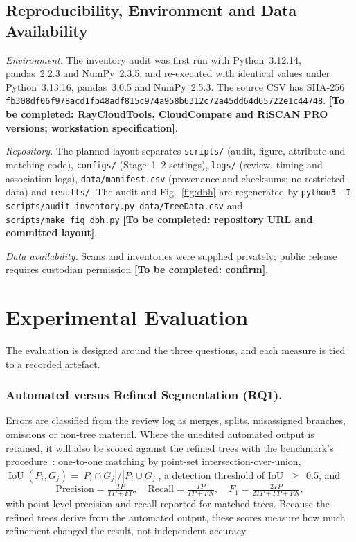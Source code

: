 \documentclass[runningheads]{llncs}
\newcommand{\todo}[1]{\textbf{[To be completed: #1]}}
\begin{document}
\subsection{Reproducibility, Environment and Data Availability}\label{sec:repro}
\emph{Environment.} The inventory audit was first run with Python~3.12.14, pandas~2.2.3 and NumPy~2.3.5, and re-executed with identical values under Python~3.13.16, pandas~3.0.5 and NumPy~2.5.3. The source CSV has SHA-256 \nolinkurl{fb308df06f978acd1fb48adf815c974a958b6312c72a45dd64d65722e1c44748}. \todo{RayCloudTools, CloudCompare and RiSCAN PRO versions; workstation specification}.

{\sloppy\emph{Repository.} The planned layout separates \texttt{scripts/} (audit, figure, attribute and matching code), \texttt{configs/} (Stage~1--2 settings), \texttt{logs/} (review, timing and association logs), \texttt{data/manifest.csv} (provenance and checksums; no restricted data) and \texttt{results/}. The audit and Fig.~\ref{fig:dbh} are regenerated by \texttt{python3 -I scripts/audit\_inventory.py data/TreeData.csv} and \texttt{scripts/make\_fig\_dbh.py} \todo{repository URL and committed layout}.\par}

\emph{Data availability.} Scans and inventories were supplied privately; public release requires custodian permission \todo{confirm}.

\section{Experimental Evaluation}\label{sec:eval}
The evaluation is designed around the three questions, and each measure is tied to a recorded artefact.

\subsubsection{Automated versus Refined Segmentation (RQ1).}
Errors are classified from the review log as merges, splits, misassigned branches, omissions or non-tree material. Where the unedited automated output is retained, it will also be scored against the refined trees with the benchmark's procedure~\cite{cherlet2026}: one-to-one matching by point-set intersection-over-union, $\operatorname{IoU}(P_i,G_j)=|P_i\cap G_j|/|P_i\cup G_j|$, a detection threshold of IoU~$\geq$~0.5, and
\begin{equation}
\text{Precision}=\tfrac{TP}{TP+FP},\quad \text{Recall}=\tfrac{TP}{TP+FN},\quad F_1=\tfrac{2TP}{2TP+FP+FN},
\end{equation}
with point-level precision and recall reported for matched trees. Because the refined trees derive from the automated output, these scores measure how much refinement changed the result, not independent accuracy.
\end{document}
